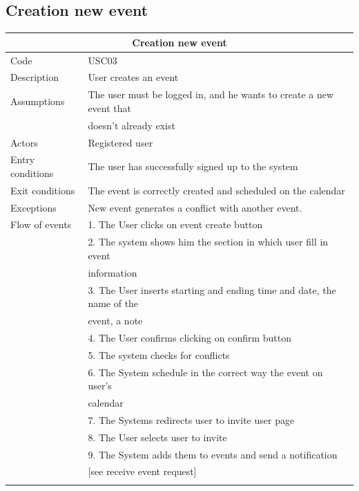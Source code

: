 \documentclass[12pt]{book}
\begin{document}
\subsection{Creation new event }
\begin{center}
\vspace*{\fill}
\begin{tabular}{ |l|l| }
  		\hline
  		\hline
  		\multicolumn{2}{|c|}{\large{\textbf{Creation new event}}} \\
  		\hline
  		\hline
  		Code  & USC03\\ 
		\hline
		Description & User creates an event\\
		\hline
		Assumptions & The user must be logged in, and he wants to create a new event that\\& doesn't already exist\\
		\hline
		Actors & Registered user\\
		\hline
		Entry conditions & The user has successfully signed up to the system\\
		\hline
		Exit conditions & The event is correctly created and scheduled on the calendar \\
		\hline
		Exceptions & New event generates a conflict with another event. \\
		\hline
		Flow of events & 
			1. The User clicks on event create button\\&
			2. The system shows him the section in which user fill in event\\& information \\&
			3. The User inserts starting and ending time and date, the name of the \\ & event, a note \\&
			4. The User confirms clicking on confirm button\\&
			5. The system checks for conflicts\\&
			6. The System schedule in the correct way the event on user's \\&calendar\\&
			7. The Systems redirects user to invite user page\\&
			8. The User selects user to invite\\&
			9. The System adds them to events and send a notification\\& [see receive event request]\\
  		\hline
		&\\

\end{tabular}
\end{center}
\end{document}
